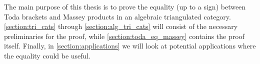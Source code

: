 The main purpose of this thesis is to prove the equality (up to a sign) between Toda brackets and Massey products in an algebraic triangulated category. \autoref{section:tri_cats} through \autoref{section:alg_tri_cats} will consist of the necessary preliminaries for the proof, while \autoref{section:toda_eq_massey} contains the proof itself. Finally, in \autoref{section:applications} we will look at potential applications where the equality could be useful.
